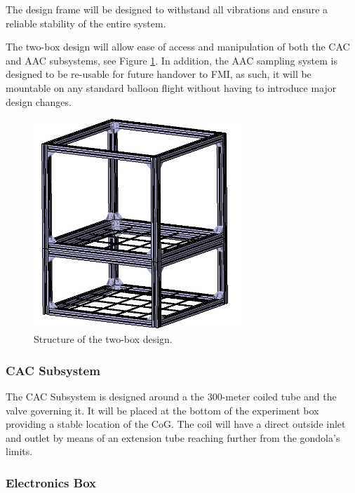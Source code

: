 The design frame will be designed to withstand all vibrations and ensure a reliable stability of the entire system. 

The two-box design will allow ease of access and manipulation of both the CAC and AAC subsystems, see Figure \ref{strucutre}. In addition, the AAC sampling system is designed to be re-usable for future handover to FMI, as such, it will be mountable on any standard balloon flight without having to introduce major design changes.

\begin{figure}[!ht]
    \centering
    \includegraphics[width=0.7\textwidth]{4-experiment-design/img/frame_structure.jpg}
    \caption{Structure of the two-box design.}
    \label{strucutre}
\end{figure}

\subsubsection{CAC Subsystem}

The CAC Subsystem is designed around a the 300-meter coiled tube and the valve governing it. It will be placed at the bottom of the experiment box providing a stable location of the CoG. The coil will have a direct outside inlet and outlet by means of an extension tube reaching further from the gondola’s limits.


\subsubsection{Electronics Box}

